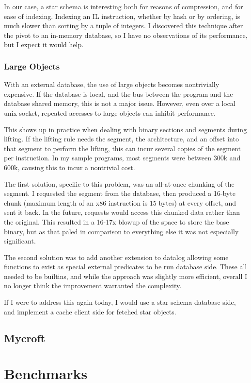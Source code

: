 In our case, a star schema is interesting both for reasons of compression, and for ease of indexing.
Indexing an IL instruction, whether by hash or by ordering, is much slower than sorting by a tuple of integers.
I discovered this technique after the pivot to an in-memory database, so I have no observations of its performance, but I expect it would help.

\subsubsection{Large Objects}
With an external database, the use of large objects becomes nontrivially expensive.
If the database is local, and the bus between the program and the database shared memory, this is not a major issue.
However, even over a local unix socket, repeated accesses to large objects can inhibit performance.

This shows up in practice when dealing with binary sections and segments during lifting.
If the lifting rule needs the segment, the architecture, and an offset into that segment to perform the lifting, this can incur several copies of the segment per instruction.
In my sample programs, most segments were between 300k and 600k, causing this to incur a nontrivial cost.

The first solution, specific to this problem, was an all-at-once chunking of the segment.
I requested the segment from the database, then produced a 16-byte chunk (maximum length of an x86 instruction is 15 bytes) at every offset, and sent it back.
In the future, requests would access this chunked data rather than the original.
This resulted in a 16-17x blowup of the space to store the base binary, but as that paled in comparison to everything else it was not especially significant.

The second solution was to add another extension to datalog allowing some functions to exist as special external predicates to be run database side.
These all needed to be builtins, and while the approach was slightly more efficient, overall I no longer think the improvement warranted the complexity.

If I were to address this again today, I would use a star schema database side, and implement a cache client side for fetched star objects.
\subsection{Mycroft}

\section{Benchmarks}
